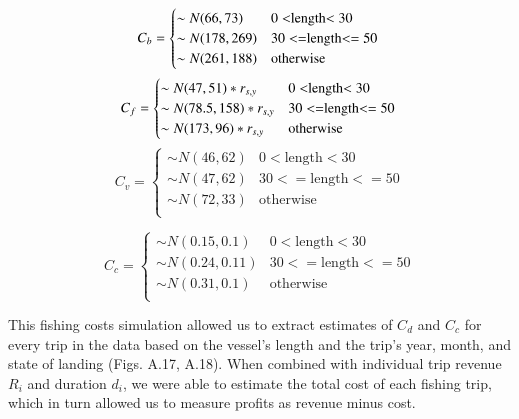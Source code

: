 \documentclass[]{elsarticle} %
\begin{document}
\begin{equation}
  C_b =
    \begin{cases}
      \sim N(66,73) & \text{$0<$length$<30$}\\
      \sim N(178,269) & \text{$30<=$length$<=50$}\\
      \sim N(261,188) & \text{otherwise}\\
    \end{cases}\\
\end{equation} \begin{equation}
  C_f =
    \begin{cases}
      \sim N(47,51)*r_{s,y} & \text{$0<$length$<30$}\\
      \sim N(78.5,158)*r_{s,y} & \text{$30<=$length$<=50$}\\
      \sim N(173,96)*r_{s,y} & \text{otherwise}\\
    \end{cases}\\
\end{equation} \begin{equation}
  C_v =
    \begin{cases}
      \sim N(46,62) & \text{$0<$length$<30$}\\
      \sim N(47,62) & \text{$30<=$length$<=50$}\\
      \sim N(72,33) & \text{otherwise}\\
    \end{cases}
\end{equation}

\begin{equation}
  C_c = 
  \begin{cases}
      \sim N(0.15,0.1) & \text{$0<$length$<30$}\\
      \sim N(0.24,0.11) & \text{$30<=$length$<=50$}\\
      \sim N(0.31,0.1) & \text{otherwise}\\
  \end{cases}
\end{equation}

This fishing costs simulation allowed us to extract estimates of \(C_d\)
and \(C_c\) for every trip in the data based on the vessel's length and
the trip's year, month, and state of landing (Figs. A.17, A.18). When
combined with individual trip revenue \(R_i\) and duration \(d_i\), we
were able to estimate the total cost of each fishing trip, which in turn
allowed us to measure profits as revenue minus cost.
\end{document}
